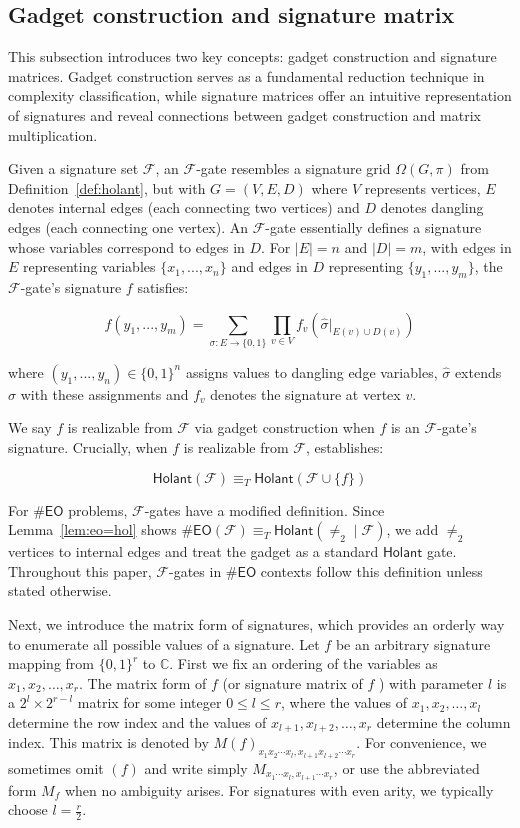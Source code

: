 \documentclass[a4paper,UKenglish,cleveref, autoref, thm-restate]{lipics-v2021}
\newcommand{\hol}[0]{\textsf{Holant}}
\newcommand{\eo}[0]{\textsf{EO}}
\begin{document}
\subsection{Gadget construction and signature matrix}\label{section:GC}

This subsection introduces two key concepts: gadget construction and signature matrices. Gadget construction serves as a fundamental reduction technique in complexity classification, while signature matrices offer an intuitive representation of signatures and reveal connections between gadget construction and matrix multiplication.

Given a signature set $\mathcal{F}$, an $\mathcal{F}$-gate resembles a signature grid $\Omega(G,\pi)$ from Definition~\ref{def:holant}, but with $G=(V,E,D)$ where $V$ represents vertices, $E$ denotes internal edges (each connecting two vertices) and $D$ denotes dangling edges (each connecting one vertex).
An $\mathcal{F}$-gate essentially defines a signature whose variables correspond to edges in $D$. For $|E|=n$ and $|D|=m$, with edges in $E$ representing variables $\{x_1,...,x_n\}$ and edges in $D$ representing $\{y_1,...,y_m\}$, the $\mathcal{F}$-gate's signature $f$ satisfies:

$$f(y_1,...,y_m)=\sum_{\sigma:E\rightarrow\{0,1\}}\prod_{v\in V}f_v(\hat{\sigma}|_{E(v)\cup D(v)})$$

where $(y_1,...,y_n)\in\{0,1\}^n$ assigns values to dangling edge variables, $\hat{\sigma}$ extends 
$\sigma$ with these assignments and $f_v$ denotes the signature at vertex $v$.

We say $f$ is realizable from $\mathcal{F}$ via gadget construction when $f$ is an $\mathcal{F}$-gate's signature. 
Crucially, when $f$ is realizable from $\mathcal{F}$, \cite[Lemma 1.3]{cai2017complexity} establishes:

$$\hol(\mathcal{F})\equiv_T\hol(\mathcal{F}\cup\{f\})$$

For $\#\eo$ problems, $\mathcal{F}$-gates have a modified definition. Since Lemma~\ref{lem:eo=hol} shows $\#\eo(\mathcal{F})\equiv_T\hol(\neq_2\mid\mathcal{F})$, we add $\neq_2$ vertices to internal edges
and treat the gadget as a standard $\hol$ gate.
Throughout this paper, $\mathcal{F}$-gates in $\#\eo$ contexts follow this definition unless stated otherwise.

Next, we introduce the matrix form of signatures, which provides an orderly way to enumerate all possible values of a signature. 
Let $f$ be an arbitrary signature mapping from $\{0,1\}^r$ to $\mathbb{C}$. First we fix an ordering of the variables as $x_1,x_2,\ldots,x_r$. The matrix form of $f$ (or signature matrix of $f$ \cite{cai2017complexity}) with parameter $l$ is a $2^l\times 2^{r-l}$ matrix for some integer $0\leq l\leq r$, where the values of $x_1,x_2,\ldots,x_l$ determine the row index and the values of $x_{l+1},x_{l+2},\ldots,x_r$ determine the column index. 
This matrix is denoted by $M(f)_{x_1x_2\cdots x_l,x_{l+1}x_{l+2}\cdots x_r}$. For convenience, we sometimes omit $(f)$ and write simply $M_{x_1\cdots x_l,x_{l+1}\cdots x_r}$, or use the abbreviated form $M_f$ when no ambiguity arises. For signatures with even arity, we typically choose $l=\frac{r}{2}$.
\end{document}
